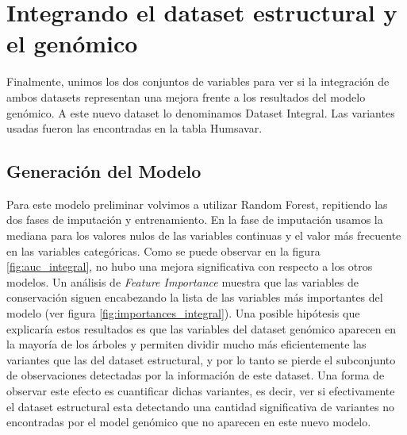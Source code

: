 


\section{Integrando el dataset estructural y el genómico}

Finalmente, unimos los dos conjuntos de variables para ver si la integración de ambos datasets representan una mejora frente a los resultados del modelo genómico. A este nuevo dataset lo denominamos Dataset Integral. Las variantes usadas fueron las encontradas en la tabla Humsavar. 

\subsection{Generación del Modelo}

Para este modelo preliminar volvimos a utilizar Random Forest, repitiendo las dos fases de imputación y entrenamiento. En la fase de imputación usamos la mediana para los valores nulos de las variables continuas y el valor más frecuente en las variables categóricas. Como se puede observar en la figura \ref{fig:auc_integral}, no hubo una mejora significativa con respecto a los otros modelos. Un análisis de \textit{Feature Importance} muestra que las variables de conservación siguen encabezando la lista de las variables más importantes del modelo (ver figura \ref{fig:importances_integral}). Una posible hipótesis que explicaría estos resultados es que las variables del dataset genómico aparecen en la mayoría de los árboles y permiten dividir mucho más eficientemente las variantes que las del dataset estructural, y por lo tanto se pierde el subconjunto de observaciones detectadas por la información de este dataset. Una forma de observar este efecto es cuantificar dichas variantes, es decir, ver si efectivamente el dataset estructural esta detectando una cantidad significativa de variantes no encontradas por el model genómico que no aparecen en este nuevo modelo. 


